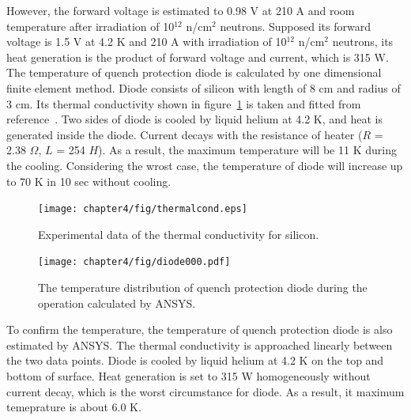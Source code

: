 However, the forward voltage is estimated to 0.98 V at 210 A and room temperature after irradiation of 10$^{12}$ n/cm$^2$ neutrons.
Supposed its forward voltage is 1.5 V at 4.2 K and 210 A with irradiation of 10$^{12}$ n/cm$^2$ neutrons, its heat generation is the product of forward voltage and current, which is 315 W.
The temperature of quench protection diode is calculated by one dimensional finite element method.
Diode consists of silicon with length of 8 cm and radius of 3 cm.
Its thermal conductivity shown in figure~\ref{sicond} is taken and fitted from reference~\cite{glass}\cite{holl}.
Two sides of diode is cooled by liquid helium at 4.2 K, and heat is generated inside the diode.
Current decays with the resistance of heater ($R$ = 2.38 $\Omega$, $L$ = 254 $H$).
As a result, the maximum temperature will be 11 K during the cooling.
Considering the wrost case, the temperature of diode will increase up to 70 K in 10 sec without cooling.
\begin{figure}[H]
  \centering
  \texttt{[image: chapter4/fig/thermalcond.eps]}
  \caption{Experimental data of the thermal conductivity for silicon.}
  \label{sicond}
\end{figure}
\begin{figure}[H]
 \centering
 \texttt{[image: chapter4/fig/diode000.pdf]}
 \caption{The temperature distribution of quench protection diode during the operation calculated by ANSYS.}
 \label{ansys}
\end{figure}
To confirm the temperature, the temperature of quench protection diode is also estimated by ANSYS.
The thermal conductivity is approached linearly between the two data points.
Diode is cooled by liquid helium at 4.2 K on the top and bottom of surface.
Heat generation is set to 315 W homogeneously without current decay, which is the worst circumstance for diode.
As a result, it maximum temeprature is about 6.0 K.


